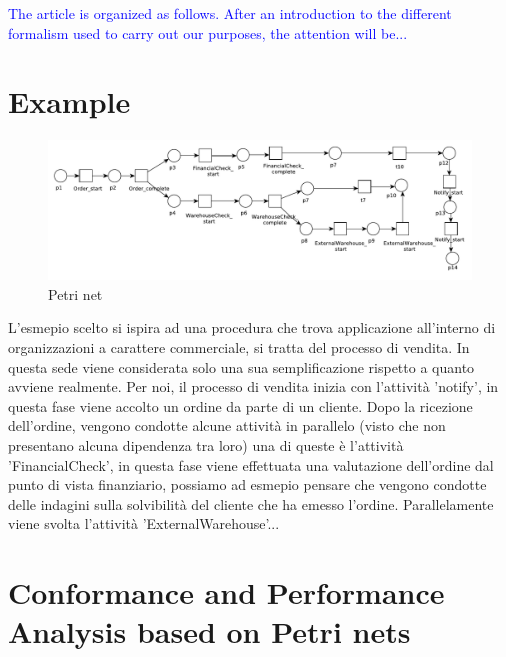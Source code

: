 \documentclass[11pt]{article}
\begin{document}
\textcolor{blue}{
The article is organized as follows. After an introduction to the different formalism used to carry out our purposes, the attention will be...
}

\section{Example}\label{example}


\begin{figure}[t]\label{ConfLog}
\includegraphics[width=360pt]
{./items/Sales_PN.pdf}
\caption{Petri net}
\end{figure}

L'esmepio scelto si ispira ad una procedura che trova applicazione all'interno di organizzazioni a carattere commerciale, si tratta del processo di vendita. In questa sede viene considerata solo una sua semplificazione rispetto a quanto avviene realmente. Per noi, il processo di vendita inizia con l'attività 'notify', in questa fase viene accolto un ordine da parte di un cliente. Dopo la ricezione dell'ordine, vengono condotte alcune attività in parallelo (visto che non presentano alcuna dipendenza tra loro) una di queste è l'attività 'FinancialCheck', in questa fase viene effettuata una valutazione dell'ordine dal punto di vista finanziario, possiamo ad esmepio pensare che vengono condotte delle indagini sulla solvibilità del cliente che ha emesso l'ordine. Parallelamente viene svolta l'attività 'ExternalWarehouse'...

\section{Conformance and Performance Analysis based on Petri nets}
\end{document}
